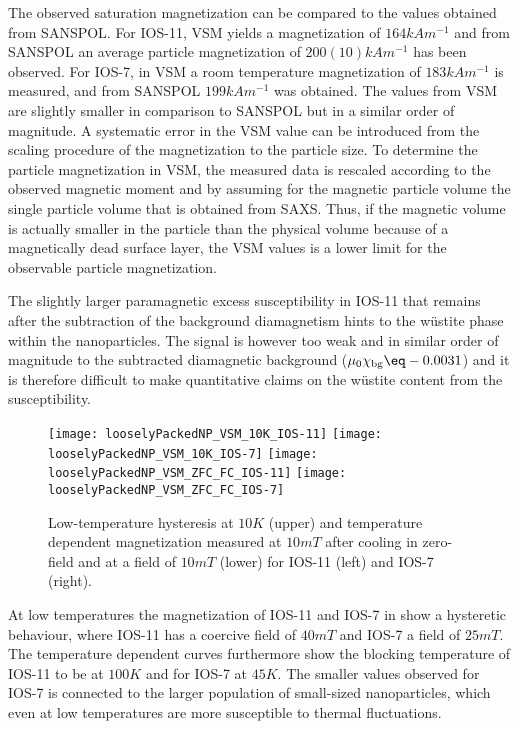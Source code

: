 \documentclass[\main/dresen_thesis.tex]{subfiles}
\begin{document}
  The observed saturation magnetization can be compared to the values obtained from SANSPOL.
  For IOS-11, VSM yields a magnetization of $164 \unit{kA m^{-1}}$ and from SANSPOL an average particle magnetization of $200(10)\unit{kA m^{-1}}$ has been observed.
  For IOS-7, in VSM a room temperature magnetization of $183 \unit{kA m^{-1}}$ is measured, and from SANSPOL $199\unit{kA m^{-1}}$ was obtained.
  The values from VSM are slightly smaller in comparison to SANSPOL but in a similar order of magnitude.
  A systematic error in the VSM value can be introduced from the scaling procedure of the magnetization to the particle size.
  To determine the particle magnetization in VSM, the measured data is rescaled according to the observed magnetic moment and by assuming for the magnetic particle volume the single particle volume that is obtained from SAXS.
  Thus, if the magnetic volume is actually smaller in the particle than the physical volume \eg because of a magnetically dead surface layer, the VSM values is a lower limit for the observable particle magnetization.

  The slightly larger paramagnetic excess susceptibility in IOS-11 that remains after the subtraction of the background diamagnetism hints to the w\"ustite phase within the nanoparticles.
  The signal is however too weak and in similar order of magnitude to the subtracted diamagnetic background ($\mu_0 \chi_\mathrm{bg} \eq -0.0031$) and it is therefore difficult to make quantitative claims on the w\"ustite content from the susceptibility.

  \begin{figure}[tb]
    \centering
    \texttt{[image: looselyPackedNP\_VSM\_10K\_IOS-11]}
    \texttt{[image: looselyPackedNP\_VSM\_10K\_IOS-7]}
    \texttt{[image: looselyPackedNP\_VSM\_ZFC\_FC\_IOS-11]}
    \texttt{[image: looselyPackedNP\_VSM\_ZFC\_FC\_IOS-7]}
    \caption{\label{fig:looselyPackedNP:nanoparticle:vsm10}Low-temperature hysteresis at $10 \unit{K}$ (upper) and temperature dependent magnetization measured at $10 \unit{mT}$ after cooling in zero-field and at a field of $10 \unit{mT}$ (lower) for IOS-11 (left) and IOS-7 (right).}
  \end{figure}
  At low temperatures the magnetization of IOS-11 and IOS-7 in  show a hysteretic behaviour, where IOS-11 has a coercive field of $40 \unit{mT}$ and IOS-7 a field of $25 \unit{mT}$.
  The temperature dependent curves furthermore show the blocking temperature of IOS-11 to be at $100 \unit{K}$ and for IOS-7 at $45 \unit{K}$.
  The smaller values observed for IOS-7 is connected to the larger population of small-sized nanoparticles, which even at low temperatures are more susceptible to thermal fluctuations.
\end{document}
